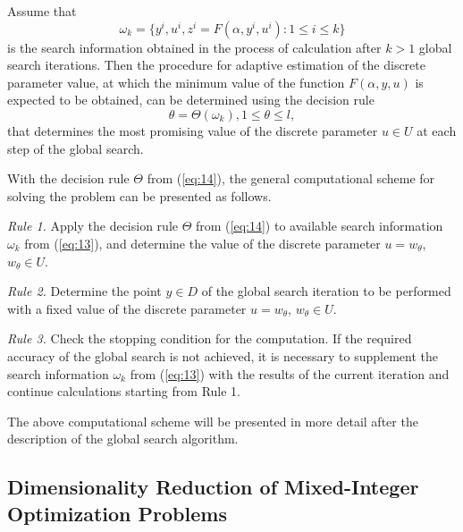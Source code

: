 \documentclass{svproc}
\begin{document}
Assume that 
\begin{equation}\label{eq:13}
 \omega_k=\{ y^i,u^i,z^i=F(\alpha,y^i,u^i ): 1\leq i\leq k \}
\end{equation}
is the search information obtained in the process of calculation after $k>1$ global search iterations. Then the procedure for adaptive estimation of the discrete parameter value, at which the minimum value  of the function $F(\alpha,y,u)$ is expected to be obtained, can be determined using the decision rule
\begin{equation}\label{eq:14}
	\theta =\Theta(\omega_k ),1 \leq \theta \leq l, 
\end{equation}
 that determines the most promising value of the discrete parameter $u \in U$ at each step of the global search.

With the decision rule $\Theta$ from (\ref{eq:14}), the general computational scheme for solving the problem can be presented as follows.

\textit{Rule 1.} Apply the decision rule $\Theta$ from (\ref{eq:14}) to available search information $\omega_k$ from (\ref{eq:13}),  and determine the value of the discrete parameter $u=w_\theta$, $w_\theta \in U$.

\textit{Rule 2.} Determine the point $y \in D$ of the global search iteration to be performed with a fixed value of the discrete parameter $u=w_\theta$, $w_\theta \in U$.
			
\textit{Rule 3.} Check the stopping condition for the computation. If the required accuracy of the global search is not achieved, it is necessary to supplement the search information $\omega_k$ from (\ref{eq:13}) with the results of the current iteration and continue calculations starting from Rule 1.

   The above computational scheme will be presented in more detail after the description of the global search algorithm. 



\subsection{Dimensionality Reduction of Mixed-Integer Optimization Problems} \label{subsec:32}
\end{document}
